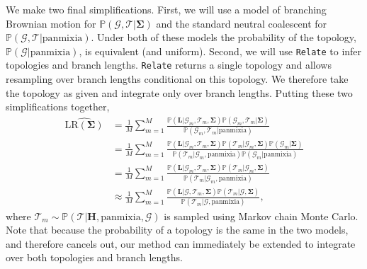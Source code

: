 \documentclass[12pt]{article}
\begin{document}
We make two final simplifications.
First, we will use a model of branching Brownian motion for $\mathbb{P}(\mathcal{G}, \mathcal{T} | \mathbf{\Sigma})$ and the standard neutral coalescent for $\mathbb{P}(\mathcal{G}, \mathcal{T} | \mathrm{panmixia})$.
Under both of these models the probability of the topology, $\mathbb{P}(\mathcal{G} | \mathrm{panmixia})$, is equivalent (and uniform).
Second, we will use \texttt{Relate} \citep{speidel2019method} to infer topologies and branch lengths.
\texttt{Relate} returns a single topology and allows resampling over branch lengths conditional on this topology.
We therefore take the topology as given and integrate only over branch lengths.
Putting these two simplifications together,
%
\begin{equation}\label{eq:LRmontecarlo}
\begin{aligned}
\widehat{\mathrm{LR}(\mathbf{\Sigma})} &= \frac{1}{M} \sum_{m=1}^{M} \frac{ \mathbb{P}(\mathbf{L} | \mathcal{G}_m, \mathcal{T}_m, \mathbf{\Sigma}) \mathbb{P}(\mathcal{G}_m, \mathcal{T}_m | \mathbf{\Sigma})}{\mathbb{P}(\mathcal{G}_m, \mathcal{T}_m | \mathrm{panmixia})}\\
&= \frac{1}{M} \sum_{m=1}^{M} \frac{ \mathbb{P}(\mathbf{L} | \mathcal{G}_m, \mathcal{T}_m, \mathbf{\Sigma}) \mathbb{P}(\mathcal{T}_m | \mathcal{G}_m, \mathbf{\Sigma}) \mathbb{P}(\mathcal{G}_m | \mathbf{\Sigma})}{\mathbb{P}(\mathcal{T}_m | \mathcal{G}_m, \mathrm{panmixia}) \mathbb{P}(\mathcal{G}_m | \mathrm{panmixia})}\\
&= \frac{1}{M} \sum_{m=1}^{M} \frac{ \mathbb{P}(\mathbf{L} | \mathcal{G}_m, \mathcal{T}_m, \mathbf{\Sigma}) \mathbb{P}(\mathcal{T}_m | \mathcal{G}_m, \mathbf{\Sigma})}{\mathbb{P}(\mathcal{T}_m | \mathcal{G}_m, \mathrm{panmixia}) }\\
&\approx \frac{1}{M} \sum_{m=1}^{M} \frac{ \mathbb{P}(\mathbf{L} | \mathcal{G}, \mathcal{T}_m, \mathbf{\Sigma}) \mathbb{P}(\mathcal{T}_m | \mathcal{G}, \mathbf{\Sigma})}{\mathbb{P}(\mathcal{T}_m | \mathcal{G}, \mathrm{panmixia})},
\end{aligned}
\end{equation}
%
where $\mathcal{T}_m \sim \mathbb{P}(\mathcal{T} | \mathbf{H}, \mathrm{panmixia}, \mathcal{G})$ is sampled using Markov chain Monte Carlo.
Note that because the probability of a topology is the same in the two models, and therefore cancels out, our method can immediately be extended to integrate over both topologies and branch lengths.
\end{document}

